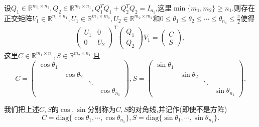 \documentclass[../../main.tex]{subfiles}%
\begin{document}
\begin{theorem}[CS分解]\label{theorem:CS分解}
设\( Q_1 \in \mathbb{R}^{m_1 \times n_1}, Q_2 \in \mathbb{R}^{m_2 \times n_1}, Q_1^T Q_1 + Q_2^T Q_2 = I_{n_1} \),这里\( \min\{m_1, m_2\} \geqslant  n_1 \).则存在正交矩阵\( V_1 \in \mathbb{R}^{n_1 \times n_1}, U_1 \in \mathbb{R}^{m_1 \times m_1}, U_2 \in \mathbb{R}^{m_2 \times m_2} \)和\( 0 \leqslant  \theta_1 \leqslant  \theta_2 \leqslant  \cdots \leqslant  \theta_{n_1} \leqslant  \frac{\pi}{2} \)使得
\begin{align}
\begin{pmatrix}
U_1 & 0 \\
0 & U_2
\end{pmatrix}^T \begin{pmatrix}
Q_1 \\
Q_2
\end{pmatrix} V_1 = \begin{pmatrix}
C \\
S
\end{pmatrix}, \label{eq:23.27182342343}
\end{align}
这里\( C \in \mathbb{R}^{m_1 \times n_1}, S \in \mathbb{R}^{m_2 \times n_1} \).且
\[
C = \begin{pmatrix}
\cos \theta_1 & & \\
& \cos \theta_2 & \\
& & \ddots \\
& & & \cos \theta_{n_1}
\end{pmatrix}, S = \begin{pmatrix}
\sin \theta_1 & & \\
& \sin \theta_2 & \\
& & \ddots \\
& & & \sin \theta_{n_1}
\end{pmatrix}.
\]
\end{theorem}
\begin{remark}
我们把上述\( C, S \)的\( \cos, \sin \)分别称为\( C, S \)的对角线,并记作(即使不是方阵)
\[
C = \text{diag}\{\cos \theta_1, \cdots, \cos \theta_{n_1}\}, S = \text{diag}\{\sin \theta_1, \cdots, \sin \theta_{n_1}\}.
\]
\end{remark}
\end{document}
